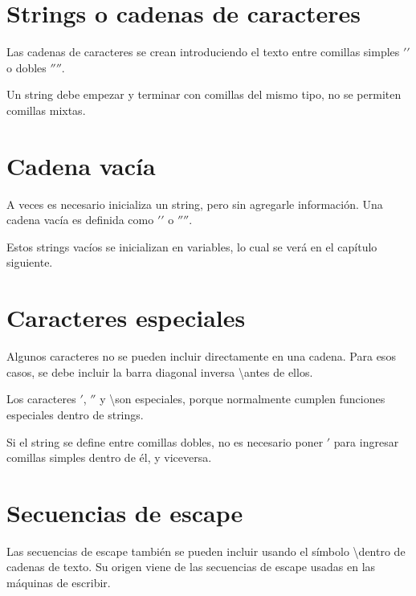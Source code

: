 \documentclass{report}
\begin{document}
\section{Strings o cadenas de caracteres}

Las cadenas de caracteres se crean introduciendo el texto entre comillas simples $'$$'$ o dobles $''$$''$.


Un string debe empezar y terminar con comillas del mismo tipo, no se permiten comillas mixtas.


\section{Cadena vacía}

A veces es necesario inicializa un string, pero sin agregarle información. Una cadena vacía es definida como $'$$'$ o $''$$''$.


Estos strings vacíos se inicializan en variables, lo cual se verá en el capítulo siguiente.

\section{Caracteres especiales}

Algunos caracteres no se pueden incluir directamente en una cadena. Para esos casos, se debe incluir la barra diagonal inversa \textbackslash antes de ellos.


Los caracteres $'$, $''$ y \textbackslash son especiales, porque normalmente cumplen funciones especiales dentro de strings.

Si el string se define entre comillas dobles, no es necesario poner $'$ para ingresar comillas simples dentro de él, y viceversa.


\section{Secuencias de escape}

Las secuencias de escape también se pueden incluir usando el símbolo \textbackslash dentro de cadenas de texto. Su origen viene de las secuencias de escape usadas en las máquinas de escribir.
\end{document}
